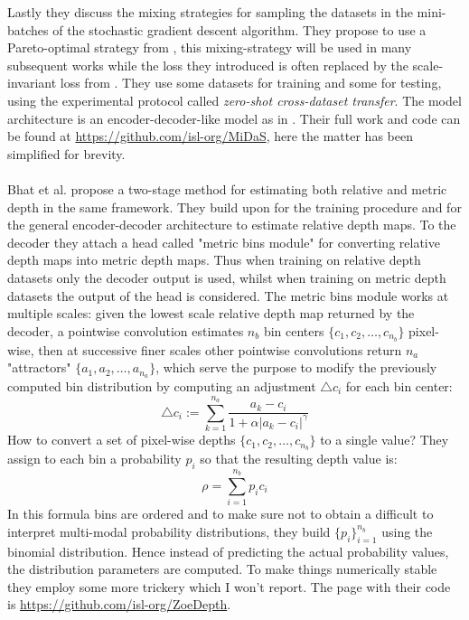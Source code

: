 Lastly they discuss the mixing strategies for sampling the datasets in the mini-batches of the stochastic gradient descent algorithm. They propose to use a Pareto-optimal strategy from \cite{pareto}, this mixing-strategy will be used in many subsequent works while the loss they introduced is often replaced by the scale-invariant loss from \cite{Eigen}. They use some datasets for training and some for testing, using the experimental protocol called \textit{zero-shot cross-dataset transfer}. The model architecture is an encoder-decoder-like model as in \cite{ReDWeb}. Their full work and code can be found at \url{https://github.com/isl-org/MiDaS}, here the matter has been simplified for brevity.\\
\\
Bhat et al. \cite{ZoeDepth} propose a two-stage method for estimating both relative and metric depth in the same framework. They build upon \cite{MiDas} for the training procedure and \cite{denseViT} for the general encoder-decoder architecture to estimate relative depth maps. To the decoder they attach a head called "metric bins module" for converting relative depth maps into metric depth maps. Thus when training on relative depth datasets only the decoder output is used, whilst when training on metric depth datasets the output of the head is considered. The metric bins module works at multiple scales: given the lowest scale relative depth map returned by the decoder, a pointwise convolution estimates $n_{b}$ bin centers $\{c_{1}, c_{2}, \dotsc, c_{n_{b}}\}$ pixel-wise, then at successive finer scales other pointwise convolutions return $n_{a}$ "attractors" $\{a_{1}, a_{2}, \dotsc, a_{n_{a}}\}$, which serve the purpose to modify the previously computed bin distribution by computing an adjustment $\triangle c_{i}$ for each bin center:
\[
	\triangle c_{i} := \sum_{k=1}^{n_{a}} \frac{a_{k} - c_{i}}{1 + \alpha | a_{k} - c_{i} |^{\gamma}}
\]
How to convert a set of pixel-wise depths $\{c_{1}, c_{2}, \dotsc, c_{n_{b}}\}$ to a single value? They assign to each bin a probability $p_{i}$ so that the resulting depth value is:
\[
	\rho = \sum_{i=1}^{n_{b}} p_{i} c_{i}
\]
In this formula bins are ordered and to make sure not to obtain a difficult to interpret multi-modal probability distributions, they build $\{p_{i}\}_{i=1}^{n_{b}}$ using the binomial distribution. Hence instead of predicting the actual probability values, the distribution parameters are computed. To make things numerically stable they employ some more trickery which I won't report. The page with their code is \url{https://github.com/isl-org/ZoeDepth}.\\
